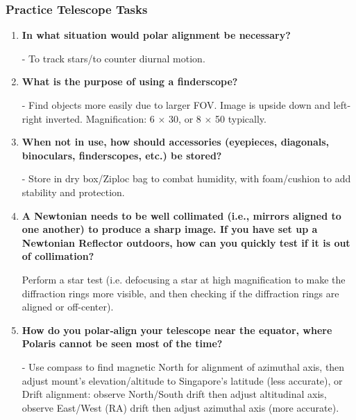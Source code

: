 \documentclass[a4paper,12pt]{extarticle}
\begin{document}
\subsubsection{Practice Telescope Tasks}
\begin{enumerate}
	\item \textbf{In what situation would polar alignment be necessary?}
	\begin{sol}
		- To track stars/to counter diurnal motion.
	\end{sol}
	
	\item\textbf{ What is the purpose of using a finderscope?}
	\begin{sol}
		- Find objects more easily due to larger FOV. Image is upside down and left-right inverted.
		Magnification: 6 $\times$ 30, or 8 $\times$ 50 typically.
	\end{sol}
	
	\item \textbf{When not in use, how should accessories (eyepieces, diagonals, binoculars, finderscopes, etc.) be stored?}
	\begin{sol}
		- Store in dry box/Ziploc bag to combat humidity, with foam/cushion to add stability and protection.
	\end{sol}
	
	\item \textbf{A Newtonian needs to be well collimated (i.e., mirrors
	aligned to one another) to produce a sharp image. If you have set up a Newtonian Reflector outdoors, how can you
	quickly test if it is out of collimation?}
	\begin{sol}
		Perform a star test (i.e. defocusing a star at high magnification to make the diffraction rings more visible, and then checking if the diffraction rings are aligned or off-center).
	\end{sol}
	\item \textbf{How do you polar‐align your telescope near the equator, where Polaris cannot be seen most of the time?}
	
	\begin{sol}
		- Use compass to find magnetic North for alignment of azimuthal axis, then adjust mount's elevation/altitude to Singapore’s latitude  (less accurate), or\\
		
		Drift alignment: observe North/South drift then adjust altitudinal axis, observe East/West (RA) drift then adjust azimuthal axis (more accurate).
	\end{sol}
	

\end{enumerate}
\end{document}
